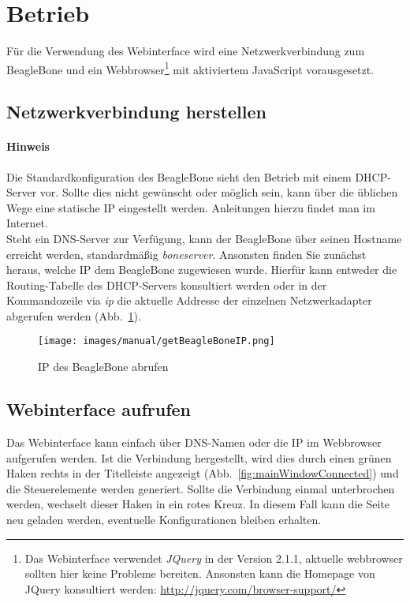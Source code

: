 \documentclass[manual.tex]{subfiles}
\begin{document}
\section{Betrieb}
Für die Verwendung des Webinterface wird eine Netzwerkverbindung zum BeagleBone und ein Webbrowser\footnote{Das Webinterface verwendet \emph{JQuery} in der Version 2.1.1, aktuelle webbrowser sollten hier keine Probleme bereiten. Ansonsten kann die Homepage von JQuery konsultiert werden: \url{http://jquery.com/browser-support/}} mit aktiviertem JavaScript vorausgesetzt.


\subsection{Netzwerkverbindung herstellen}

\paragraph{Hinweis} Die Standardkonfiguration des BeagleBone sieht den Betrieb mit einem DHCP-Server vor. Sollte dies nicht gewünscht oder möglich sein, kann über die üblichen Wege eine statische IP eingestellt werden. Anleitungen hierzu findet man im Internet.\\

Steht ein DNS-Server zur Verfügung, kann der BeagleBone über seinen Hostname erreicht werden, standardmäßig \textit{boneserver}. Ansonsten finden Sie zunächst heraus, welche IP dem BeagleBone zugewiesen wurde. Hierfür kann entweder die Routing-Tabelle des DHCP-Servers konsultiert werden oder in der Kommandozeile via \emph{ip} die aktuelle Addresse der einzelnen Netzwerkadapter abgerufen werden \mbox{(Abb. \ref{fig:getBeagleBoneIP})}.

\begin{figure}[ht]
	\centering
	\texttt{[image: images/manual/getBeagleBoneIP.png]}
	\caption{IP des BeagleBone abrufen}
	\label{fig:getBeagleBoneIP}
\end{figure}


\subsection{Webinterface aufrufen}
Das Webinterface kann einfach über DNS-Namen oder die IP im Webbrowser aufgerufen werden. Ist die Verbindung hergestellt, wird dies durch einen grünen Haken rechts in der Titelleiste angezeigt \mbox{(Abb. \ref{fig:mainWindowConnected})} und die Steuerelemente werden generiert.
Sollte die Verbindung einmal unterbrochen werden, wechselt dieser Haken in ein rotes Kreuz. In diesem Fall kann die Seite neu geladen werden, eventuelle Konfigurationen bleiben erhalten.
\end{document}

